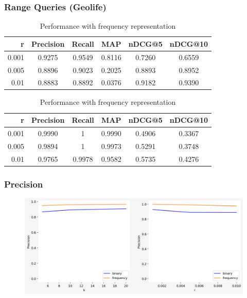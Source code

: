 \documentclass{beamer}
\begin{document}
\begin{frame}
\frametitle{Range Queries (Geolife)} 
\begin{block}{} \vspace{-3mm}
\begin{table}[!htbp]
{\footnotesize
\centering
\begin{tabular}{rccccc}
 	{\bf r } 	& {\bf Precision}& {\bf Recall}	&	{\bf MAP}	 & {\bf nDCG@5}	& {\bf nDCG@10} \\ \midrule
  	0.001   	& 	0.9275    	& 	0.9549 	&	0.8116	& 0.7260		& 0.6559	\\ \midrule
	0.005   	& 	0.8896    	& 	0.9023 	&	0.2025	& 0.8893		& 0.8952	\\ \midrule
 	0.01	 	&   	0.8883   	&      0.8892	&	0.0376	& 0.9182  		& 0.9390	\\ \bottomrule
\end{tabular} 
\caption{\footnotesize Performance with binary representation} \vspace{3mm}

\centering
\begin{tabular}{rccccc}
 	{\bf r } 	& {\bf Precision}& {\bf Recall}	&	{\bf MAP}	 & {\bf nDCG@5}	& {\bf nDCG@10} \\ \midrule
  	0.001   	& 	0.9990    	& 	1		&	0.9990	 & 0.4906			& 0.3367	\\ \midrule
	0.005   	& 	0.9894    	& 	1		&	0.9973	 & 0.5291			& 0.3748	\\ \midrule
 	0.01	 	&   	0.9765   	&      0.9978	&	0.9582	 & 0.5735  		& 0.4276	\\ \bottomrule
\end{tabular} 
\caption{\footnotesize Performance with frequency representation}
\label{table: Geolife multipass} 
}
\end{table}
\end{block}
\end{frame}



\begin{frame}
\frametitle{Precision} 
\begin{block}{} \vspace{-1cm}
\begin{figure}[h] 
\includegraphics[width=1 \textwidth]{Precision-Geolife} 
\end{figure}
\end{block}
\end{frame}
\end{document}
